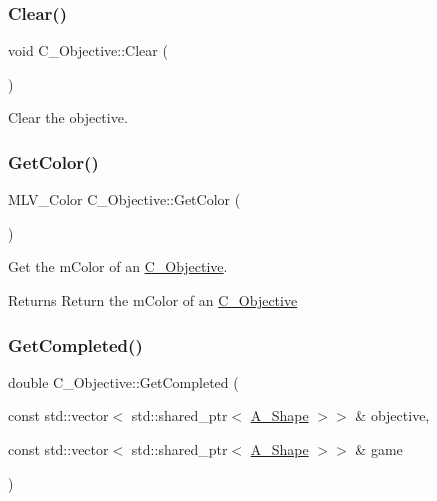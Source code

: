 \subsubsection{\texorpdfstring{Clear()}{Clear()}}
{\footnotesize\ttfamily void C\+\_\+\+Objective\+::\+Clear (\begin{DoxyParamCaption}{ }\end{DoxyParamCaption})}



Clear the objective. 

\mbox{\label{classC__Objective_aeaaa69ca15b1e1d8edbc3f1920399964}} 
\subsubsection{\texorpdfstring{Get\+Color()}{GetColor()}}
{\footnotesize\ttfamily M\+L\+V\+\_\+\+Color C\+\_\+\+Objective\+::\+Get\+Color (\begin{DoxyParamCaption}{ }\end{DoxyParamCaption})}



Get the m\+Color of an \hyperlink{classC__Objective}{C\+\_\+\+Objective}. 

\begin{DoxyReturn}{Returns}
Return the m\+Color of an \hyperlink{classC__Objective}{C\+\_\+\+Objective} 
\end{DoxyReturn}
\mbox{\label{classC__Objective_a026149982f0d62ea0a039a8b94bbaae0}} 
\subsubsection{\texorpdfstring{Get\+Completed()}{GetCompleted()}}
{\footnotesize\ttfamily double C\+\_\+\+Objective\+::\+Get\+Completed (\begin{DoxyParamCaption}\item[{const std\+::vector$<$ std\+::shared\+\_\+ptr$<$ \hyperlink{classA__Shape}{A\+\_\+\+Shape} $>$$>$ \&}]{objective,  }\item[{const std\+::vector$<$ std\+::shared\+\_\+ptr$<$ \hyperlink{classA__Shape}{A\+\_\+\+Shape} $>$$>$ \&}]{game }\end{DoxyParamCaption})}



